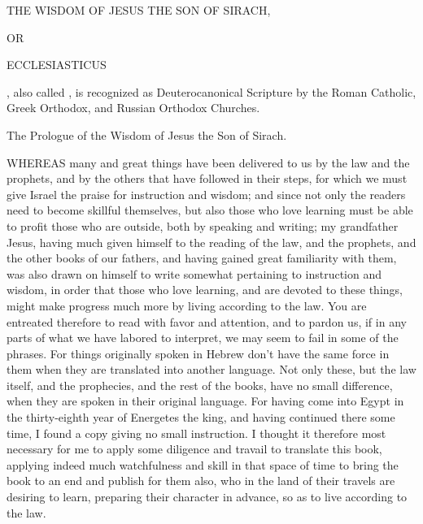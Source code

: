 ﻿\NormalFont{}
{\MT THE WISDOM OF JESUS THE SON OF SIRACH,
\par }{\MTB OR
\par }{\MT ECCLESIASTICUS
\par }{, also called
{}, is recognized as Deuterocanonical Scripture by the Roman Catholic, Greek Orthodox, and Russian Orthodox Churches.
\par }{\IS The Prologue of the Wisdom of Jesus the Son of Sirach.
\par }{\IP WHEREAS many and great things have been delivered to us by the law and the prophets, and by the others that have followed in their steps, for which we must give Israel the praise for instruction and wisdom; and since not only the readers need to become skillful themselves, but also those who love learning must be able to profit those who are outside, both by speaking and writing; my grandfather Jesus, having much given himself to the reading of the law, and the prophets, and the other books of our fathers, and having gained great familiarity with them, was also drawn on himself to write somewhat pertaining to instruction and wisdom, in order that those who love learning, and are devoted to these things, might make progress much more by living according to the law. You are entreated therefore to read with favor and attention, and to pardon us, if in any parts of what we have labored to interpret, we may seem to fail in some of the phrases. For things originally spoken in Hebrew don’t have the same force in them when they are translated into another language. Not only these, but the law itself, and the prophecies, and the rest of the books, have no small difference, when they are spoken in their original language. For having come into Egypt in the thirty-eighth year of Energetes the king, and having continued there some time, I found a copy giving no small instruction. I thought it therefore most necessary for me to apply some diligence and travail to translate this book, applying indeed much watchfulness and skill in that space of time to bring the book to an end and publish for them also, who in the land of their travels are desiring to learn, preparing their character in advance, so as to live according to the law.

}
